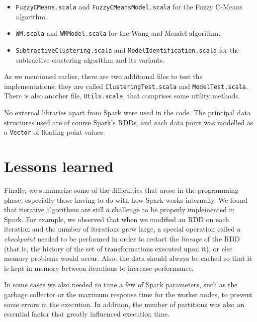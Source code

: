 \begin{itemize}
  \item \verb|FuzzyCMeans.scala| and \verb|FuzzyCMeansModel.scala| for the Fuzzy C-Means algorithm.
  \item \verb|WM.scala| and \verb|WMModel.scala| for the Wang and Mendel algorithm.
  \item \verb|SubtractiveClustering.scala| and \verb|ModelIdentification.scala| for the subtractive clustering algorithm and its variants.
\end{itemize}
As we mentioned earlier, there are two additional files to test the implementations; they are called \verb|ClusteringTest.scala| and \verb|ModelTest.scala|. There is also another file, \verb|Utils.scala|, that comprises some utility methods.

No external libraries apart from Spark were used in the code. The principal data structures used are of course Spark's RDDs, and each data point was modelled as a \verb|Vector| of floating point values.

\section*{Lessons learned}

Finally, we summarize some of the difficulties that arose in the programming phase, especially those having to do with how Spark works internally. We found that iterative algorithms are still a challenge to be properly implemented in Spark. For example, we observed that when we modified an RDD on each iteration and the number of iterations grew large, a special operation called a \textit{checkpoint} needed to be performed in order to restart the \textit{lineage} of the RDD (that is, the history of the set of transformations executed upon it), or else memory problems would occur. Also, the data should always be cached so that it is kept in memory between iterations to increase performance.

In some cases we also needed to tune a few of Spark parameters, such as the garbage collector or the maximum response time for the worker nodes, to prevent some errors in the execution. In addition, the number of partitions was also an essential factor that greatly influenced execution time.
